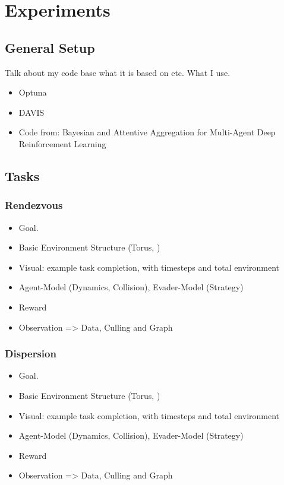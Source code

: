 
\chapter{Experiments}
\label{ch:Experiments}
\section{General Setup}
Talk about my code base what it is based on etc. What I use.
\begin{itemize}[noitemsep,nolistsep]
    \item Optuna
    \item DAVIS
    \item Code from: Bayesian and Attentive Aggregation for Multi-Agent Deep Reinforcement Learning
\end{itemize} 

\section{Tasks}
\subsection{Rendezvous}

\begin{itemize}[noitemsep,nolistsep]
    \item Goal.
    \item Basic Environment Structure (Torus, )
    \item Visual: example task completion, with timesteps and total environment
    \item Agent-Model (Dynamics, Collision), Evader-Model (Strategy)
    \item Reward
    \item Observation => Data, Culling and Graph
\end{itemize} 

\subsection{Dispersion}
\begin{itemize}[noitemsep,nolistsep]
    \item Goal.
    \item Basic Environment Structure (Torus, )
    \item Visual: example task completion, with timesteps and total environment
    \item Agent-Model (Dynamics, Collision), Evader-Model (Strategy)
    \item Reward
    \item Observation => Data, Culling and Graph
\end{itemize} 

